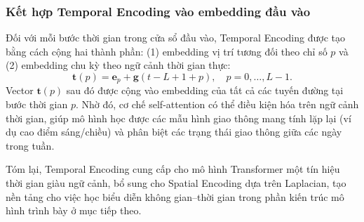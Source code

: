 \subsubsection{Kết hợp Temporal Encoding vào embedding đầu vào}
\label{subsubsec:temporal_integration}

Đối với mỗi bước thời gian trong cửa sổ đầu vào, Temporal Encoding được tạo bằng cách cộng hai thành phần:
(1) embedding vị trí tương đối theo chỉ số $p$ và (2) embedding chu kỳ theo ngữ cảnh thời gian thực:
\begin{equation}
\mathbf{t}(p) = \mathbf{e}_p + \mathbf{g}(t-L+1+p),
\quad p = 0,\dots,L-1.
\end{equation}
Vector $\mathbf{t}(p)$ sau đó được cộng vào embedding của tất cả các tuyến đường tại bước thời gian $p$.
Nhờ đó, cơ chế self-attention có thể điều kiện hóa trên ngữ cảnh thời gian, giúp mô hình học được các mẫu
hình giao thông mang tính lặp lại (ví dụ cao điểm sáng/chiều) và phân biệt các trạng thái giao thông giữa
các ngày trong tuần.

Tóm lại, Temporal Encoding cung cấp cho mô hình Transformer một tín hiệu thời gian giàu ngữ cảnh,
bổ sung cho Spatial Encoding dựa trên Laplacian, tạo nền tảng cho việc học biểu diễn không gian--thời gian
trong phần kiến trúc mô hình trình bày ở mục tiếp theo.
